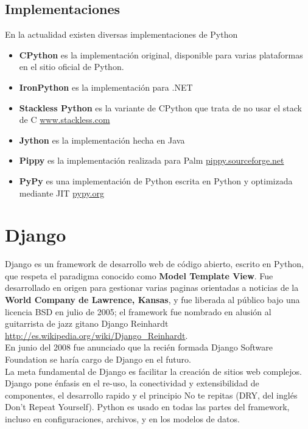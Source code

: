 \subsection{Implementaciones}

En la actualidad existen diversas implementaciones de Python

\begin{itemize}
    \item {\bfseries CPython} es la implementación original, disponible para varias plataformas en el sitio oficial de Python.
    \item {\bfseries IronPython} es la implementación para .NET
    \item {\bfseries Stackless Python} es la variante de CPython que trata de no usar el stack de C  \url{www.stackless.com}
    \item {\bfseries Jython} es la implementación hecha en Java
    \item {\bfseries Pippy} es la implementación realizada para Palm \url{pippy.sourceforge.net}
    \item {\bfseries PyPy} es una implementación de Python escrita en Python y optimizada mediante JIT \url{pypy.org}
\end{itemize}



\section{Django}

Django es un framework de desarrollo web de código abierto, escrito en Python, que respeta el paradigma conocido como {\bfseries Model Template View}. Fue desarrollado en origen para gestionar varias paginas orientadas a noticias de la {\bfseries World Company de Lawrence, Kansas}, y fue liberada al público bajo una licencia BSD en julio de 2005; el framework fue nombrado en alusión al guitarrista de jazz gitano Django Reinhardt \url{http://es.wikipedia.org/wiki/Django_Reinhardt}. \\[0.1cm]

En junio del 2008 fue anunciado que la recién formada Django Software Foundation se harí­a cargo de Django en el futuro. \\[0.1cm]

La meta fundamental de Django es facilitar la creación de sitios web complejos. Django pone énfasis en el re-uso, la conectividad y extensibilidad de componentes, el desarrollo rapido y el principio No te repitas
(DRY, del inglés Don't Repeat Yourself). Python es usado en todas las partes del framework, incluso en configuraciones, archivos, y en los modelos de datos. \\[0.1cm]


